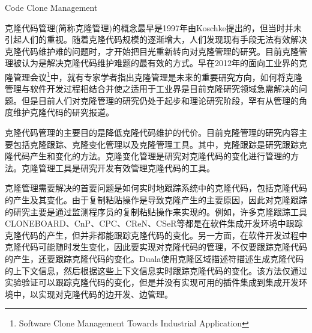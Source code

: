 {Code Clone Management}

克隆代码管理(简称克隆管理)的概念最早是1997年由Koschke提出的\cite{koschke2008frontiers}，但当时并未引起人们的重视。随着克隆代码规模的逐渐增大，人们发现现有手段无法有效解决克隆代码维护难的问题时，才开始把目光重新转向对克隆管理的研究。目前克隆管理被认为是解决克隆代码维护难题的最有效的方式。早在2012年的面向工业界的克隆管理会议\footnote{Software Clone Management Towards Industrial Application}中，就有专家学者指出克隆管理是未来的重要研究方向，如何将克隆管理与软件开发过程相结合并使之适用于工业界是目前克隆研究领域急需解决的问题\cite{koschke2012software}。但是目前人们对克隆管理的研究仍处于起步和理论研究阶段，罕有从管理的角度维护克隆代码的研究报道。



克隆代码管理的主要目的是降低克隆代码维护的代价。目前克隆管理的研究内容主要包括克隆跟踪、克隆变化管理以及克隆管理工具。其中，克隆跟踪是研究跟踪克隆代码产生和变化的方法。克隆变化管理是研究对克隆代码的变化进行管理的方法。克隆管理工具是研究开发有效管理克隆代码的工具。

克隆管理需要解决的首要问题是如何实时地跟踪系统中的克隆代码，包括克隆代码的产生及其变化。由于复制粘贴操作是导致克隆产生的主要原因，因此对克隆跟踪的研究主要是通过监测程序员的复制粘贴操作来实现的。例如，许多克隆跟踪工具CLONEBOARD\cite{de2009managing}、CnP\cite{hou2009cnp}、CPC\cite{weckerle2008cpc}、CReN\cite{jablonski2007cren}、CSeR\cite{jacob2010actively}等都是在软件集成开发环境中跟踪克隆代码的产生，但并非都能跟踪克隆代码的变化。另一方面，在软件开发过程中克隆代码可能随时发生变化，因此要实现对克隆代码的管理，不仅要跟踪克隆代码的产生，还要跟踪克隆代码的变化。Duala使用克隆区域描述符描述生成克隆代码的上下文信息，然后根据这些上下文信息实时跟踪克隆代码的变化\cite{duala2008clonetracker}\cite{duala2010clone}。该方法仅通过实验验证可以跟踪克隆代码的变化，但是并没有实现可用的插件集成到集成开发环境中，以实现对克隆代码的边开发、边管理。

